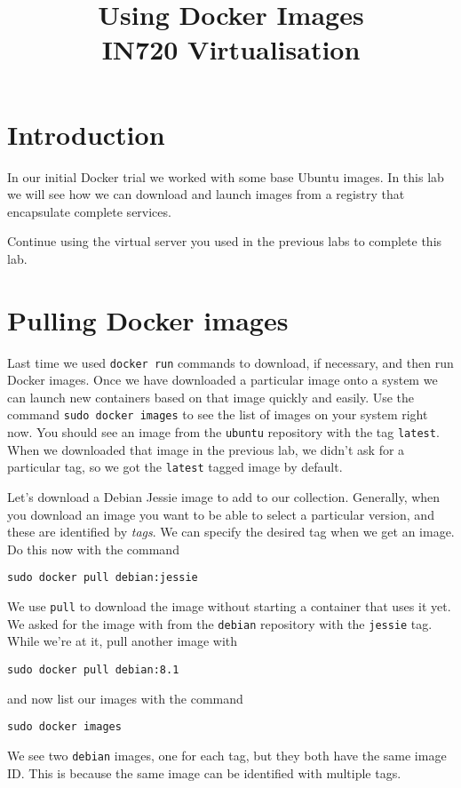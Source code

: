 \documentclass{article}
\begin{document}
\title{Using Docker Images\\ IN720 Virtualisation}
\date{}
\maketitle

\section*{Introduction}
In our initial Docker trial we worked with some base Ubuntu images.  In this lab we will see how we can download and launch images from a registry that encapsulate complete services.

Continue using the virtual server you used in the previous labs to complete this lab.

\section{Pulling Docker images}
Last time we used \texttt{docker run} commands to download, if necessary, and then run Docker images.  Once we have downloaded a particular image onto a system we can launch new containers based on that image quickly and easily.  Use the command \texttt{sudo docker images} to see the list of images on your system right now.  You should see an image from the \texttt{ubuntu} repository with the tag \texttt{latest}.  When we downloaded that image in the previous lab, we didn't ask for a particular tag, so we got the \texttt{latest} tagged image by default.

Let's download a Debian Jessie image to add to our collection.  Generally, when you download an image you want to be able to select a particular version, and these are identified by \emph{tags}.  We can specify the desired tag when we get an image.  Do this now with the command

\texttt{sudo docker pull debian:jessie}

We use \texttt{pull} to download the image without starting a container that uses it yet.  We asked for the image with from the \texttt{debian} repository with the \texttt{jessie} tag. While we're at it, pull another image with

\texttt{sudo docker pull debian:8.1}

and now list our images with the command

\texttt{sudo docker images}

We see two \texttt{debian} images, one for each tag, but they both have the same image ID. This is because the same image can be identified with multiple tags.
\end{document}
